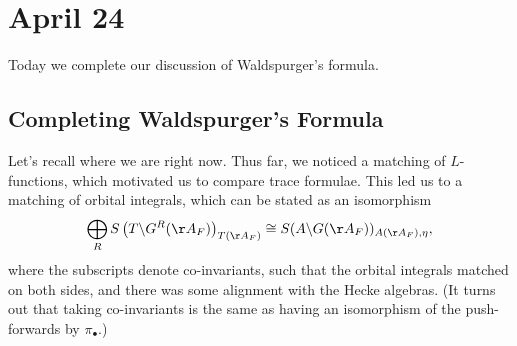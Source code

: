 \documentclass[../notes.tex]{subfiles}
\begin{document}
\section{April 24}
Today we complete our discussion of Waldspurger's formula.

\subsection{Completing Waldspurger's Formula}
Let's recall where we are right now. Thus far, we noticed a matching of $L$-functions, which motivated us to compare trace formulae. This led us to a matching of orbital integrals, which can be stated as an isomorphism
\[\bigoplus_RS\left(T\backslash G^R(\AA_F)\right)_{T(\AA_F)}\cong S(A\backslash G(\AA_F))_{A(\AA_F),\eta},\]
where the subscripts denote co-invariants, such that the orbital integrals matched on both sides, and there was some alignment with the Hecke algebras. (It turns out that taking co-invariants is the same as having an isomorphism of the push-forwards by $\pi_{\bullet}$.)
\end{document}
